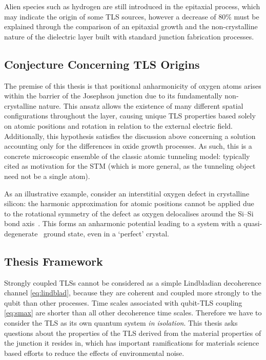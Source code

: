 Alien species such as hydrogen are still introduced in the epitaxial process, which may indicate the origin of some TLS sources, however a decrease of 80\% must be explained through the comparison of an epitaxial growth and the non-crystalline nature of the dielectric layer built with standard junction fabrication processes.

\subsection{Conjecture Concerning TLS Origins}\label{sec:conjecture}

The premise of this thesis is that positional anharmonicity of oxygen atoms arises within the  barrier of the Josephson junction due to its fundamentally non-crystalline nature.
This ansatz allows the existence of many different spatial configurations throughout the layer, causing unique TLS properties based solely on atomic positions and rotation in relation to the external electric field.
Additionally, this hypothesis satisfies the discussion above concerning a solution accounting only for the differences in oxide growth processes.
As such, this is a concrete microscopic ensemble of the classic atomic tunneling model: typically cited as motivation for the STM (which is more general, as the tunneling object need not be a single atom).

As an illustrative example, consider an interstitial oxygen defect in crystalline silicon: the harmonic approximation for atomic positions cannot be applied due to the rotational symmetry of the defect as oxygen delocalises around the Si--Si bond axis~\cite{Artacho1995}.
This forms an anharmonic potential leading to a system with a quasi-degenerate~\cite{DuBois2013} ground state, even in a `perfect' crystal.


\subsection{Thesis Framework}

Strongly coupled TLSs cannot be considered as a simple Lindbladian decoherence channel \cref{eq:lindblad}, because they are coherent and coupled more strongly to the qubit than other processes.
Time scales associated with qubit-TLS coupling \cref{eq:smax} are shorter than all other decoherence time scales.
Therefore we have to consider the TLS as its own quantum system \textit{in isolation}.
This thesis asks questions about the properties of the TLS derived from the material properties of the junction it resides in, which has important ramifications for materials science based efforts to reduce the effects of environmental noise.

